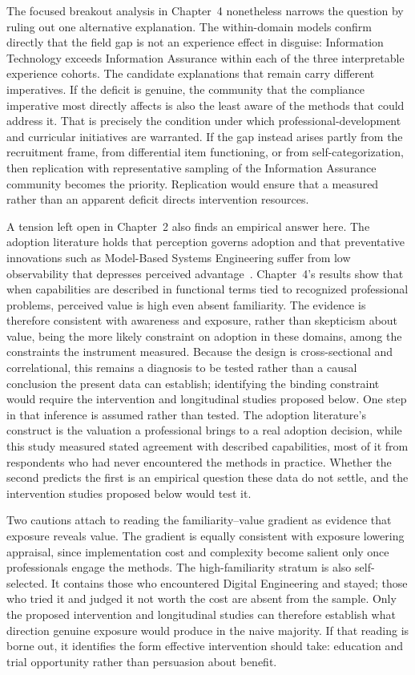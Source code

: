 The focused breakout analysis in Chapter~4 nonetheless narrows the question by ruling out one alternative explanation. The within-domain models confirm directly that the field gap is not an experience effect in disguise: Information Technology exceeds Information Assurance within each of the three interpretable experience cohorts. The candidate explanations that remain carry different imperatives. If the deficit is genuine, the community that the compliance imperative most directly affects is also the least aware of the methods that could address it. That is precisely the condition under which professional-development and curricular initiatives are warranted. If the gap instead arises partly from the recruitment frame, from differential item functioning, or from self-categorization, then replication with representative sampling of the Information Assurance community becomes the priority. Replication would ensure that a measured rather than an apparent deficit directs intervention resources.

A tension left open in Chapter~2 also finds an empirical answer here. The adoption literature holds that perception governs adoption and that preventative innovations such as Model-Based Systems Engineering suffer from low observability that depresses perceived advantage~\parencite{Call_2024}. Chapter~4's results show that when capabilities are described in functional terms tied to recognized professional problems, perceived value is high even absent familiarity. The evidence is therefore consistent with awareness and exposure, rather than skepticism about value, being the more likely constraint on adoption in these domains, among the constraints the instrument measured. Because the design is cross-sectional and correlational, this remains a diagnosis to be tested rather than a causal conclusion the present data can establish; identifying the binding constraint would require the intervention and longitudinal studies proposed below. One step in that inference is assumed rather than tested. The adoption literature's construct is the valuation a professional brings to a real adoption decision, while this study measured stated agreement with described capabilities, most of it from respondents who had never encountered the methods in practice. Whether the second predicts the first is an empirical question these data do not settle, and the intervention studies proposed below would test it.

Two cautions attach to reading the familiarity--value gradient as evidence that exposure reveals value. The gradient is equally consistent with exposure lowering appraisal, since implementation cost and complexity become salient only once professionals engage the methods. The high-familiarity stratum is also self-selected. It contains those who encountered Digital Engineering and stayed; those who tried it and judged it not worth the cost are absent from the sample. Only the proposed intervention and longitudinal studies can therefore establish what direction genuine exposure would produce in the naive majority. If that reading is borne out, it identifies the form effective intervention should take: education and trial opportunity rather than persuasion about benefit.

